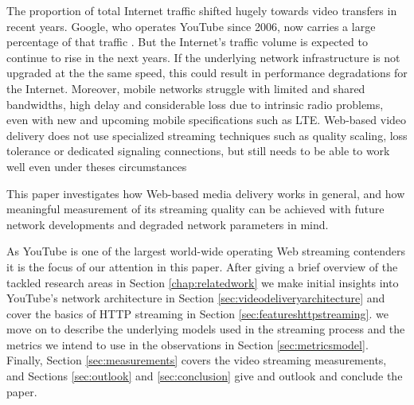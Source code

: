 The proportion of total Internet traffic shifted hugely towards video transfers in recent years. Google, who operates YouTube since 2006, now carries a large percentage of that traffic \cite{nw2010carrier}. But the Internet's traffic volume is expected to continue to rise in the next years. If the underlying network infrastructure is not upgraded at the the same speed, this could result in performance degradations for the Internet. Moreover, mobile networks struggle with limited and shared bandwidths, high delay and considerable loss due to intrinsic radio problems, even with new and upcoming mobile specifications such as LTE. Web-based video delivery does not use specialized streaming techniques such as quality scaling, loss tolerance or dedicated signaling connections, but still needs to be able to work well even under theses circumstances



This paper investigates how Web-based media delivery works in general, and how meaningful measurement of its streaming quality can be achieved with future network developments and degraded network parameters in mind.

As YouTube is one of the largest world-wide operating Web streaming contenders it is the focus of our attention in this paper. After giving a brief overview of the tackled research areas in Section \ref{chap:relatedwork} we make initial insights into YouTube's network architecture in Section \ref{sec:videodeliveryarchitecture} and cover the basics of HTTP streaming in Section \ref{sec:featureshttpstreaming}. we move on to describe the underlying models used in the streaming process and the metrics we intend to use in the observations in Section \ref{sec:metricsmodel}. Finally, Section \ref{sec:measurements} covers the video streaming measurements, and Sections \ref{sec:outlook} and \ref{sec:conclusion} give and outlook and conclude the paper.











